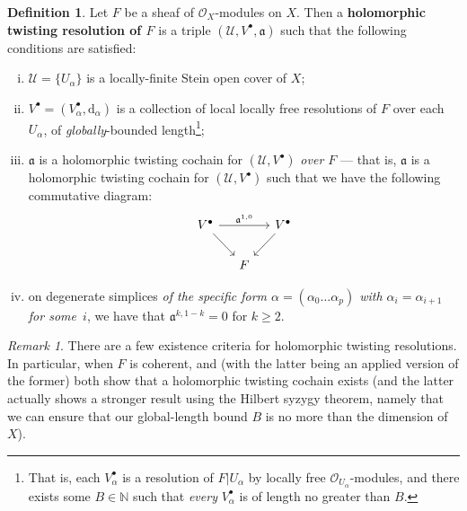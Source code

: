 \documentclass[11pt,fleqn]{article}
\theoremstyle{plain}
\theoremstyle{definition}
\newtheorem{definition}[theorem]{Definition}
\theoremstyle{remark}
\newtheorem{remark}[theorem]{Remark}
\numberwithin{equation}{theorem}
\newcommand{\cover}{\mathcal{U}}
\newcommand{\OO}{\mathcal{O}}
\newcommand{\restricted}{\mathbin{\big\vert}}
\newcommand{\twc}{\mathfrak{a}}
\newcommand{\define}[1]{\textbf{#1}}
\renewcommand{\d}{\mathrm{d}}
\begin{document}
        \begin{definition}\label{definition:holomorphic-twisted-resolution}
            Let $F$ be a sheaf of $\OO_X$-modules on $X$.
            Then a \define{holomorphic twisting resolution of $F$} is a triple $(\cover,V^\bullet,\twc)$ such that the following conditions are satisfied:
            \begin{enumerate}[(i)]
                \item $\cover=\{U_\alpha\}$ is a locally-finite Stein open cover of $X$;
                \item $V^\bullet=(V^\bullet_\alpha,\d_\alpha)$ is a collection of local locally free resolutions of $F$ over each $U_\alpha$, of \emph{globally}-bounded length\footnote{That is, each $V^\bullet_\alpha$ is a resolution of $F\restricted {U_\alpha}$ by locally free $\OO_{U_\alpha}$-modules, and there exists some $B\in\mathbb{N}$ such that \emph{every} $V^\bullet_\alpha$ is of length no greater than $B$.};
                \item $\twc$ is a holomorphic twisting cochain for $(\cover,V^\bullet)$ \textit{over $F$} --- that is, $\twc$ is a holomorphic twisting cochain for $(\cover,V^\bullet)$ such that we have the following commutative diagram:
                    \begin{equation*}
                        \begin{tikzcd}[column sep=small]
                            V^\bullet
                                \ar{rr}{\twc^{1,0}}
                                \ar{dr}
                        &&  V^\bullet
                                \ar{dl}
                        \\& F
                        \end{tikzcd}
                    \end{equation*}
                \item on degenerate simplices \emph{of the specific form $\alpha=(\alpha_0\ldots\alpha_p)$ with $\alpha_i=\alpha_{i+1}$ for some~$i$}, we have that $\twc^{k,1-k}=0$ for $k\geqslant2$.
            \end{enumerate}
        \end{definition}

        \begin{remark}
            There are a few existence criteria for holomorphic twisting resolutions.
            In particular, when $F$ is coherent, \cite[Lemma~8.13]{Toledo&Tong1976} and \cite[Lemma~2.4]{Toledo&Tong1978} (with the latter being an applied version of the former) both show that a holomorphic twisting cochain exists (and the latter actually shows a stronger result using the Hilbert syzygy theorem, namely that we can ensure that our global-length bound $B$ is no more than the dimension of $X$).
        \end{remark}
\end{document}
